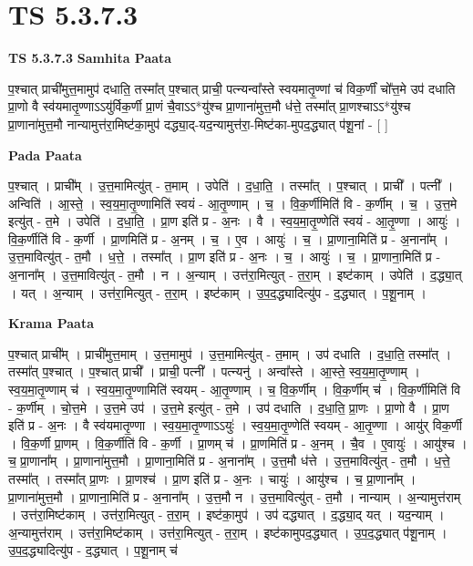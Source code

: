 \documentclass[17pt]{extarticle}
\begin{document}
\section{ TS 5.3.7.3 }

\textbf{TS 5.3.7.3 } \newline
\textbf{Samhita Paata} \newline

प॒श्चात् प्राची॑मुत्त॒मामुप॑ दधाति॒ तस्मा᳚त् प॒श्चात् प्राची॒ पत्न्यन्वा᳚स्ते स्वयमातृ॒ण्णां च॑ विक॒र्णीं चो᳚त्त॒मे उप॑ दधाति प्रा॒णो वै स्व॑यमातृ॒ण्णाऽऽयु॑र्विक॒र्णी प्रा॒णं चै॒वाऽऽ*यु॑श्च प्रा॒णाना॑मुत्त॒मौ ध॑त्ते॒ तस्मा᳚त् प्रा॒णश्चाऽऽ*यु॑श्च प्रा॒णाना॑मुत्त॒मौ नान्यामुत्त॑रा॒मिष्ट॑का॒मुप॑ दद्ध्या॒द्-यद॒न्यामुत्त॑रा॒-मिष्ट॑का-मुपद॒द्ध्यात् प॑शू॒नां - [  ] \newline

\textbf{Pada Paata} \newline

प॒श्चात् । प्राची᳚म् । उ॒त्त॒मामित्यु॑त् - त॒माम् । उपेति॑ । द॒धा॒ति॒ । तस्मा᳚त् । प॒श्चात् । प्राची᳚ । पत्नी᳚ । अन्विति॑ । आ॒स्ते॒ । स्व॒य॒मा॒तृ॒ण्णामिति॑ स्वयं - आ॒तृ॒ण्णाम् । च॒ । वि॒क॒र्णीमिति॑ वि - क॒र्णीम् । च॒ । उ॒त्त॒मे इत्यु॑त् - त॒मे । उपेति॑ । द॒धा॒ति॒ । प्रा॒ण इति॑ प्र - अ॒नः । वै । स्व॒य॒मा॒तृ॒ण्णेति॑ स्वयं - आ॒तृ॒ण्णा । आयुः॑ । वि॒क॒र्णीति॑ वि - क॒र्णी । प्रा॒णमिति॑ प्र - अ॒नम् । च॒ । ए॒व । आयुः॑ । च॒ । प्रा॒णाना॒मिति॑ प्र - अ॒नाना᳚म् । उ॒त्त॒मावित्यु॑त् - त॒मौ । ध॒त्ते॒ । तस्मा᳚त् । प्रा॒ण इति॑ प्र - अ॒नः । च॒ । आयुः॑ । च॒ । प्रा॒णाना॒मिति॑ प्र - अ॒नाना᳚म् । उ॒त्त॒मावित्यु॑त् - त॒मौ । न । अ॒न्याम् । उत्त॑रा॒मित्युत् - त॒रा॒म् । इष्ट॑काम् । उपेति॑ । द॒द्ध्या॒त् । यत् । अ॒न्याम् । उत्त॑रा॒मित्युत् - त॒रा॒म् । इष्ट॑काम् । उ॒प॒द॒द्ध्यादित्यु॑प - द॒द्ध्यात् । प॒शू॒नाम् ।  \newline


\textbf{Krama Paata} \newline

प॒श्चात् प्राची᳚म् । प्राची॑मुत्त॒माम् । उ॒त्त॒मामुप॑ । उ॒त्त॒मामित्यु॑त् - त॒माम् । उप॑ दधाति । द॒धा॒ति॒ तस्मा᳚त् । तस्मा᳚त् प॒श्चात् । प॒श्चात् प्राची᳚ । प्राची॒ पत्नी᳚ । पत्न्यनु॑ । अन्वा᳚स्ते । आ॒स्ते॒ स्व॒य॒मा॒तृ॒ण्णाम् । स्व॒य॒मा॒तृ॒ण्णाम् च॑ । स्व॒य॒मा॒तृ॒ण्णामिति॑ स्वयम् - आ॒तृ॒ण्णाम् । च॒ वि॒क॒र्णीम् । वि॒क॒र्णीम् च॑ । वि॒क॒र्णीमिति॑ वि - क॒र्णीम् । चो॒त्त॒मे । उ॒त्त॒मे उप॑ । उ॒त्त॒मे इत्यु॑त् - त॒मे । उप॑ दधाति । द॒धा॒ति॒ प्रा॒णः । प्रा॒णो वै । प्रा॒ण इति॑ प्र - अ॒नः । वै स्व॑यमातृ॒ण्णा । स्व॒य॒मा॒तृ॒ण्णाऽऽयुः॑ । स्व॒य॒मा॒तृ॒ण्णेति॑ स्वयम् - आ॒तृ॒ण्णा । आयु॑र् विक॒र्णी । वि॒क॒र्णी प्रा॒णम् । वि॒क॒र्णीति॑ वि - क॒र्णी । प्रा॒णम् च॑ । प्रा॒णमिति॑ प्र - अ॒नम् । चै॒व । ए॒वायुः॑ । आयु॑श्च । च॒ प्रा॒णाना᳚म् । प्रा॒णाना॑मुत्त॒मौ । प्रा॒णाना॒मिति॑ प्र - अ॒नाना᳚म् । उ॒त्त॒मौ ध॑त्ते । उ॒त्त॒मावित्यु॑त् - त॒मौ । ध॒त्ते॒ तस्मा᳚त् । तस्मा᳚त् प्रा॒णः । प्रा॒णश्च॑ । प्रा॒ण इति॑ प्र - अ॒नः । चायुः॑ । आयु॑श्च । च॒ प्रा॒णाना᳚म् । प्रा॒णाना॑मुत्त॒मौ । प्रा॒णाना॒मिति॑ प्र - अ॒नाना᳚म् । उ॒त्त॒मौ न । उ॒त्त॒मावित्यु॑त् - त॒मौ । नान्याम् । अ॒न्यामुत्त॑राम् । उत्त॑रा॒मिष्ट॑काम् । उत्त॑रा॒मित्युत् - त॒रा॒म् । इष्ट॑का॒मुप॑ । उप॑ दद्ध्यात् । द॒द्ध्या॒द् यत् । यद॒न्याम् । अ॒न्यामुत्त॑राम् । उत्त॑रा॒मिष्ट॑काम् । उत्त॑रा॒मित्युत् - त॒रा॒म् । इष्ट॑कामुपद॒द्ध्यात् । उ॒प॒द॒द्ध्यात् प॑शू॒नाम् । उ॒प॒द॒द्ध्यादित्यु॑प - द॒द्ध्यात् । प॒शू॒नाम् च॑ \newline
\end{document}
